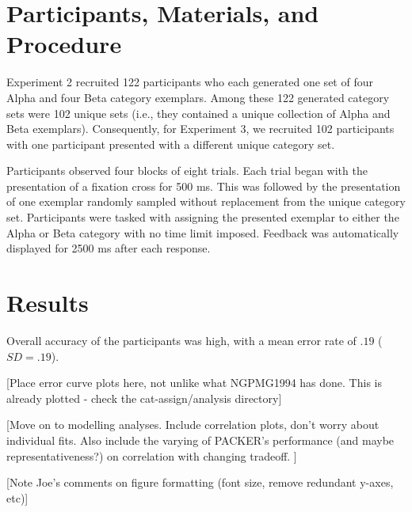 

% 

\section{Participants, Materials, and Procedure}

Experiment 2 recruited 122 participants who each generated one set of four Alpha
and four Beta category exemplars. Among these 122 generated category sets were
102 unique sets (i.e., they contained a unique collection of Alpha and Beta
exemplars). Consequently, for Experiment 3, we recruited 102 participants with
one participant presented with a different unique category set.

Participants observed four blocks of eight trials. Each trial began with the
presentation of a fixation cross for 500 ms. This was followed by the
presentation of one exemplar randomly sampled without replacement from the
unique category set. Participants were tasked with assigning the presented
exemplar to either the Alpha or Beta category with no time limit imposed.
Feedback was automatically displayed for 2500 ms after each response. 

\section{Results}

Overall accuracy of the participants was high, with a mean error rate of $.19$
($SD = .19$). 

[Place error curve plots here, not unlike what NGPMG1994 has done. This is
already plotted - check the cat-assign/analysis directory]

[Move on to modelling analyses. Include correlation plots, don't worry about
individual fits. Also include the varying of PACKER's performance (and maybe
representativeness?) on correlation with changing tradeoff. ]

[Note Joe's comments on figure formatting (font size, remove redundant y-axes, etc)]














